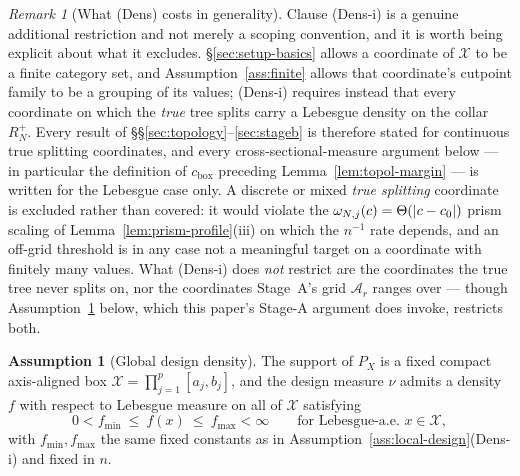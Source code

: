 \documentclass[11pt]{article}
\theoremstyle{plain}
\theoremstyle{definition}
\newtheorem{assumption}{Assumption}
\theoremstyle{remark}
\newtheorem{remark}[theorem]{Remark}
\newcommand{\cX}{\mathcal{X}}
\newcommand{\cA}{\mathcal{A}}
\DeclarePairedDelimiter{\abs}{\lvert}{\rvert}
\begin{document}
\begin{remark}[What (Dens) costs in generality]\label{rem:dens-scope}
Clause (Dens-i) is a genuine additional restriction and not merely a scoping
convention, and it is worth being explicit about what it excludes.
\S\ref{sec:setup-basics} allows a coordinate of \(\cX\) to be a finite
category set, and Assumption~\ref{ass:finite} allows that coordinate's
cutpoint family to be a grouping of its values; (Dens-i) requires instead that
every coordinate on which the \emph{true} tree splits carry a Lebesgue density
on the collar \(R_N^+\). Every result of
\S\S\ref{sec:topology}--\ref{sec:stageb} is therefore stated for continuous
true splitting coordinates, and every cross-sectional-measure argument below
--- in particular the definition of \(c_{\mathrm{box}}\) preceding
Lemma~\ref{lem:topol-margin} --- is written for the Lebesgue case only. A
discrete or mixed \emph{true splitting} coordinate is excluded rather than
covered: it would violate the \(\omega_{N,j}(c)=\Theta(\abs{c-c_0})\) prism
scaling of Lemma~\ref{lem:prism-profile}(iii) on which the \(n^{-1}\) rate
depends, and an off-grid threshold is in any case not a meaningful target on a
coordinate with finitely many values. What (Dens-i) does \emph{not} restrict
are the coordinates the true tree never splits on, nor the coordinates
Stage~A's grid \(\cA_r\) ranges over --- though
Assumption~\ref{ass:global-density} below, which this paper's Stage-A argument
does invoke, restricts both.
\end{remark}

\begin{assumption}[Global design density]\label{ass:global-density}
The support of \(P_X\) is a fixed compact axis-aligned box
\(\cX=\prod_{j=1}^p[a_j,b_j]\), and the design measure \(\nu\)
admits a density \(f\) with respect to Lebesgue measure on all of \(\cX\)
satisfying
\[
  0<f_{\min}\ \le\ f(x)\ \le\ f_{\max}<\infty
  \qquad\text{for Lebesgue-a.e.\ }x\in\cX,
\]
with \(f_{\min},f_{\max}\) the same fixed constants as in
Assumption~\ref{ass:local-design}(Dens-i) and fixed in \(n\).
\end{assumption}
\end{document}
